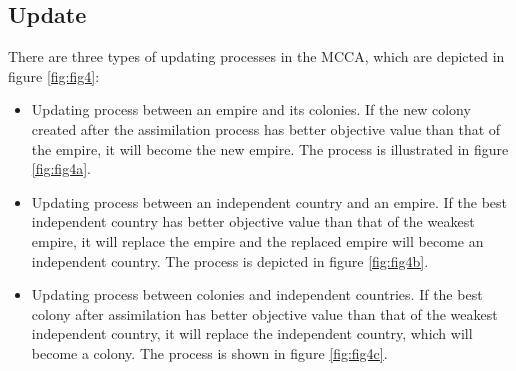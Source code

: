 \subsection{Update}
There are three types of updating processes in the MCCA, which are depicted in figure \ref{fig:fig4}:
\begin{itemize}
	\item Updating process between an empire and its colonies. If the new colony created after the assimilation process has better objective value than that of the empire, it will become the new empire. The process is illustrated in figure \ref{fig:fig4a}.
	\item Updating process between an independent country and an empire. If the best independent country has better objective value than that of the weakest empire, it will replace the empire and the replaced empire will become an independent country.  The process is depicted in figure \ref{fig:fig4b}.
	\item Updating process between colonies and independent countries. If the best colony after assimilation has better objective value than that of the weakest independent country, it will replace the independent country, which will become a colony. The process is shown in figure \ref{fig:fig4c}.
\end{itemize}

